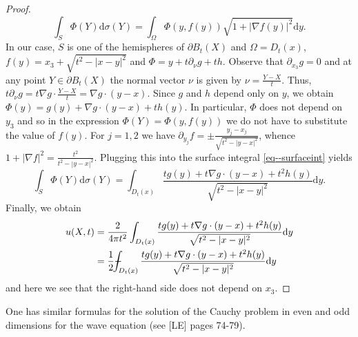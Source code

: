 \documentclass[11pt]{article}
\begin{document}
\begin{proof}
					\begin{equation}\label{eq--surfaceint}
						\int_S\Phi(Y)\mathrm{d}\sigma(Y)=\int_{\Omega}\Phi(y,f(y))\sqrt{1+|\nabla f(y)|^2}\mathrm{d}y.
					\end{equation}
					In our case, $S$ is one of the hemispheres of $\partial B_t(X)$ and $\Omega=D_t(x)$, $f(y)=x_3+\sqrt{t^2-|x-y|^2}$ and $\Phi=y+t\partial_\nu g+th$. Observe that $\partial_{x_3}g=0$ and at any point $Y\in\partial B_t(X)$ the normal vector $\nu$ is given by $\nu=\frac{Y-X}{t}$. Thus, $t\partial_\nu g=t\nabla g\cdot\frac{Y-X}{t}=\nabla g\cdot(y-x)$. Since $g$ and $h$ depend only on $y$, we obtain $\Phi(y)=g(y)+\nabla g\cdot(y-x)+th(y)$. In particular, $\Phi$ does not depend on $y_3$ and so in the expression $\Phi(Y)=\Phi(y,f(y))$ we do not have to substitute the value of $f(y)$. For $j=1,2$ we have $\partial_{y_j}f=\pm\frac{y_j-x_j}{\sqrt{t^2-|y-x|^2}}$, whence $1+|\nabla f|^2=\frac{t^2}{t^2-|y-x|^2}$. Plugging this into the surface integral \eqref{eq--surfaceint} yields
					\begin{equation*}
						\int_S\Phi(Y)\mathrm{d}\sigma(Y)=\int_{D_t(x)}\frac{tg(y)+t\nabla g\cdot(y-x)+t^2h(y)}{\sqrt{t^2-|x-y|^2}}\mathrm{d}y.
					\end{equation*}
					Finally, we obtain
					\begin{align*}
						u(X,t)&=\frac{2}{4\pi t^2}\int_{D_t(x)}\frac{tg(y)+t\nabla g\cdot(y-x)+t^2h(y)}{\sqrt{t^2-|x-y|^2}}\mathrm{d}y\\
						&=\frac{1}{2}\dashint_{D_t(x)}\frac{tg(y)+t\nabla g\cdot(y-x)+t^2h(y)}{\sqrt{t^2-|x-y|^2}}\mathrm{d}y
					\end{align*}
					and here we see that the right-hand side does not depend on $x_3$.
				\end{proof}

				\begin{remark}
					One has similar formulas for the solution of the Cauchy problem in even and odd dimensions for the wave equation (see [LE] pages 74-79).
				\end{remark}
\end{document}
